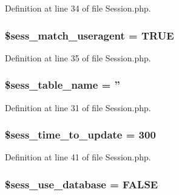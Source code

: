 Definition at line 34 of file Session.\-php.

\hypertarget{class_c_i___session_a2026f3075cd8256329189662923c1f34}{
\subsubsection[{\$sess\-\_\-match\-\_\-useragent}]{\setlength{\rightskip}{0pt plus 5cm}\$sess\-\_\-match\-\_\-useragent = T\-R\-U\-E}}\label{class_c_i___session_a2026f3075cd8256329189662923c1f34}


Definition at line 35 of file Session.\-php.

\hypertarget{class_c_i___session_ac02cd771521df3c8c52675a63097cf8f}{
\subsubsection[{\$sess\-\_\-table\-\_\-name}]{\setlength{\rightskip}{0pt plus 5cm}\$sess\-\_\-table\-\_\-name = ''}}\label{class_c_i___session_ac02cd771521df3c8c52675a63097cf8f}


Definition at line 31 of file Session.\-php.

\hypertarget{class_c_i___session_aa1487c597a0e2b1d804802a75878dd8f}{
\subsubsection[{\$sess\-\_\-time\-\_\-to\-\_\-update}]{\setlength{\rightskip}{0pt plus 5cm}\$sess\-\_\-time\-\_\-to\-\_\-update = 300}}\label{class_c_i___session_aa1487c597a0e2b1d804802a75878dd8f}


Definition at line 41 of file Session.\-php.

\hypertarget{class_c_i___session_a98c035e4010a1f494b146d950d7f41a3}{
\subsubsection[{\$sess\-\_\-use\-\_\-database}]{\setlength{\rightskip}{0pt plus 5cm}\$sess\-\_\-use\-\_\-database = F\-A\-L\-S\-E}}\label{class_c_i___session_a98c035e4010a1f494b146d950d7f41a3}


